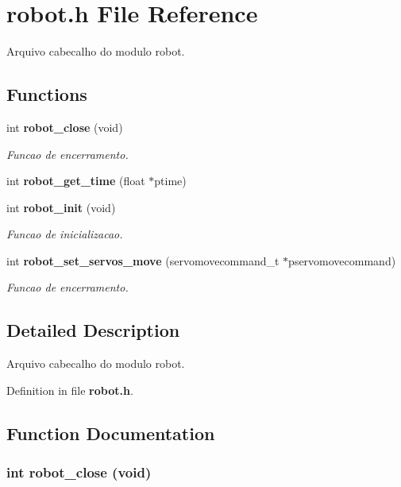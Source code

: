 \section{robot.h File Reference}
\label{robot_8h}


Arquivo cabecalho do modulo robot.  
\subsection*{Functions}
\begin{DoxyCompactItemize}
\item 
int {\bf robot\_\-close} (void)
\begin{DoxyCompactList}\small\item\em Funcao de encerramento. \item\end{DoxyCompactList}\item 
int {\bf robot\_\-get\_\-time} (float $\ast$ptime)
\item 
int {\bf robot\_\-init} (void)
\begin{DoxyCompactList}\small\item\em Funcao de inicializacao. \item\end{DoxyCompactList}\item 
int {\bf robot\_\-set\_\-servos\_\-move} (servomovecommand\_\-t $\ast$pservomovecommand)
\begin{DoxyCompactList}\small\item\em Funcao de encerramento. \item\end{DoxyCompactList}\end{DoxyCompactItemize}


\subsection{Detailed Description}
Arquivo cabecalho do modulo robot. 

Definition in file {\bf robot.h}.

\subsection{Function Documentation}
\subsubsection[{robot\_\-close}]{\setlength{\rightskip}{0pt plus 5cm}int robot\_\-close (void)}\label{robot_8h_a9a5e0a593aac8004a4b85da53e7354b3}


